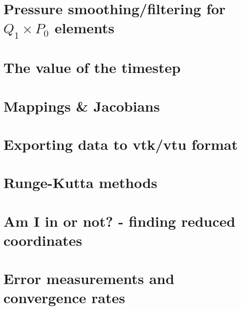 \section{Pressure smoothing/filtering for $Q_1\times P_0$ elements \label{psmoothing}} 
\newpage %
\newpage %
\section{The value of the timestep}\label{ss:cfl}  %
\newpage %
\section{Mappings \& Jacobians \label{ss:mappings}}  %
\newpage %
\section{Exporting data to vtk/vtu format}  %
\newpage %
\section{Runge-Kutta methods}\label{ss:rkm}  %
\newpage %
\section{Am I in or not? - finding reduced coordinates}\label{sec:amiin} %
\newpage %
\section{Error measurements and convergence rates}  %
\newpage %
